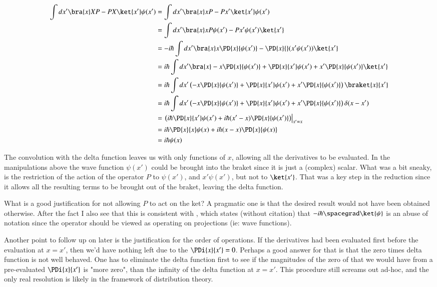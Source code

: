 \begin{align*}
\int dx' \bra{x} XP - PX \ket{x'} \psi(x')
&=
\int dx' \bra{x} x P - P x' \ket{x'} \psi(x') \\
&=
\int dx' \bra{x} x P \psi(x') - P x' \psi(x') \ket{x'} \\
&=
-i\hbar
\int dx' \bra{x} x \PD{x}{\psi(x')} - \PD{x}{}( x' \psi(x')) \ket{x'} \\
&=
i\hbar
\int dx' \bra{x} -x \PD{x}{\psi(x')} + \PD{x}{x'} \psi(x') + x' \PD{x}{\psi(x')} \ket{x'} \\
&=
i\hbar
\int dx' \left(-x \PD{x}{\psi(x')} + \PD{x}{x'} \psi(x') + x' \PD{x}{\psi(x')}\right) \braket{x}{x'} \\
&=
i\hbar
\int dx' \left(-x \PD{x}{\psi(x')} + \PD{x}{x'} \psi(x') + x' \PD{x}{\psi(x')}\right) \delta(x-x') \\
&=
\left.
\left( i \hbar \PD{x}{x'} \psi(x') + i \hbar (x' - x )\PD{x}{\psi(x')} \right)
\right\vert_{x'=x} \\
&=
i\hbar \PD{x}{x} \psi(x) + i \hbar (x - x )\PD{x}{\psi(x)}  \\
&=
i\hbar \psi(x)
\end{align*}

The convolution with the delta function leaves us with only functions of $x$, allowing all the derivatives to be evaluated.  In the manipulations above the wave function $\psi(x')$ could be brought into the braket since it is just a (complex) scalar.  What was a bit sneaky, is the restriction of the action of the operator $P$ to $\psi(x')$, and $x'\psi(x')$, but not to $\ket{x'}$.  That was a key step in the reduction since it allows all the resulting terms to be brought out of the braket, leaving the delta function.

What is a good justification for not allowing $P$ to act on the ket?  A pragmatic one is that the desired result would not have been obtained otherwise.  After the fact I also see that this is consistent with \citep{wiki:braketNotation}, which states (without citation) that $-i\hbar \spacegrad \ket{\psi}$ is an abuse of notation since the operator should be viewed as operating on projections (ie: wave functions).

Another point to follow up on later is the justification for the order of operations.  If the derivatives had been evaluated first before the evaluation at $x=x'$, then we'd have nothing left due to the $\PDi{x}{x'} = 0$.  Perhaps a good answer for that is that the zero times delta function is not well behaved.  One has to eliminate the delta function first to see if the magnitudes of the zero of that we would have from a pre-evaluated $\PDi{x}{x'}$ is "more zero", than the infinity of the delta function at $x = x'$.  This procedure still screams out ad-hoc, and the only real resolution is likely in the framework of distribution theory.

